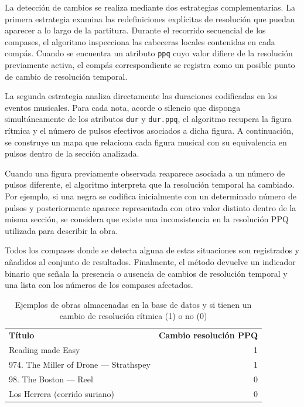 La detección de cambios se realiza mediante dos estrategias complementarias.
La primera estrategia examina las redefiniciones explícitas de resolución que puedan aparecer a lo largo de la partitura. Durante el recorrido secuencial de los compases, el algoritmo inspecciona las cabeceras locales contenidas en cada compás. Cuando se encuentra un atributo \verb|ppq| cuyo valor difiere de la resolución previamente activa, el compás correspondiente se registra como un posible punto de cambio de resolución temporal.

La segunda estrategia analiza directamente las duraciones codificadas en los eventos musicales. Para cada nota, acorde o silencio que disponga simultáneamente de los atributos \verb|dur| y \verb|dur.ppq|, el algoritmo recupera la figura rítmica y el número de pulsos efectivos asociados a dicha figura. A continuación, se construye un mapa que relaciona cada figura musical con su equivalencia en pulsos dentro de la sección analizada.

Cuando una figura previamente observada reaparece asociada a un número de pulsos diferente, el algoritmo interpreta que la resolución temporal ha cambiado. Por ejemplo, si una negra se codifica inicialmente con un determinado número de pulsos y posteriormente aparece representada con otro valor distinto dentro de la misma sección, se considera que existe una inconsistencia en la resolución PPQ utilizada para describir la obra.

Todos los compases donde se detecta alguna de estas situaciones son registrados y añadidos al conjunto de resultados. Finalmente, el método devuelve un indicador binario que señala la presencia o ausencia de cambios de resolución temporal y una lista con los números de los compases afectados.

\begin{table}[H]
\centering
\begin{tabular}{lr}
\textbf{Título} & \textbf{Cambio resolución PPQ} \\
Reading made Easy & 1 \\
974.  The Miller of Drone — Strathspey & 1 \\
98.  The Boston — Reel & 0 \\
Los Herrera (corrido suriano) & 0 \\
\end{tabular}
\caption{Ejemplos de obras almacenadas en la base de datos y si tienen un cambio de resolución rítmica (1) o no (0)}
\end{table}

